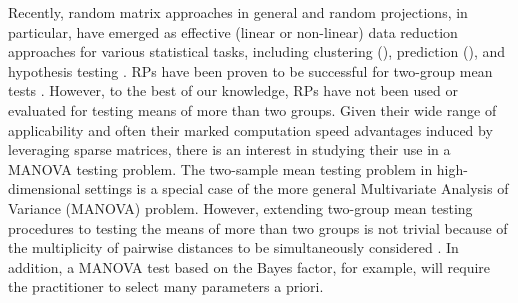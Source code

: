 \documentclass[times,sort&compress,3p]{elsarticle}
\theoremstyle{plain}%
\theoremstyle{definition}
\begin{document}
Recently, random matrix approaches in general and random projections, in particular, have emerged as effective (linear or non-linear) data reduction approaches for various statistical tasks, including clustering (\cite{vrahatis2020ensemble,wan2020sharp}), prediction (\cite{Mukhopadhyay2020targeted}), and hypothesis testing \cite{lopes2011more,srivastava2014raptt, zoh2018powerful}. RPs have been proven to be successful for two-group mean tests \cite{lopes2011more, srivastava2014raptt,zoh2018powerful}. However, to the best of our knowledge, RPs have not been used or evaluated for testing means of more than two groups. Given their wide range of applicability and often their marked computation speed advantages induced by leveraging sparse matrices, there is an interest in studying their use in a MANOVA testing problem. The two-sample mean testing problem in high-dimensional settings is a special case of the more general Multivariate Analysis of Variance (MANOVA) problem. However, extending two-group mean testing procedures to testing the means of more than two groups is not trivial because of the multiplicity of pairwise distances to be simultaneously considered \cite{cai2014high}. In addition, a MANOVA test based on the Bayes factor, for example, will require the practitioner to select many parameters a priori. 
\end{document}
